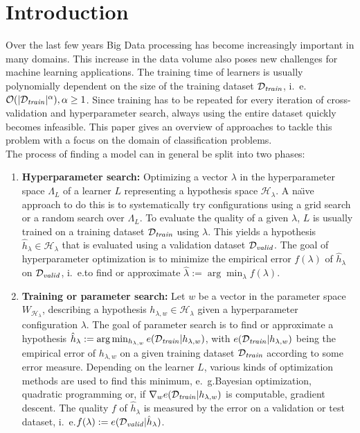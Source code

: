 \section{Introduction}%
\label{sec:intro}

\setcounter{page}{1}			%

Over the last few years Big Data processing has become increasingly important in many domains.
This increase in the data volume also poses new challenges for machine learning applications.
The training time of learners is usually polynomially dependent on the size of the training dataset \(\mathcal{D}_{\mathit{train}}\), i.~e. \(\mathcal{O}(|\mathcal{D}_{\mathit{train}}|^\alpha), \alpha \geq 1\).
Since training has to be repeated for every iteration of cross-validation and hyperparameter search, always using the entire dataset quickly becomes infeasible.
This paper gives an overview of approaches to tackle this problem with a focus on the domain of classification problems.\\

The process of finding a model can in general be split into two phases:
\begin{enumerate}
	\item \textbf{Hyperparameter search:}
		Optimizing a vector \(\lambda\) in the hyperparameter space \(\Lambda_L\) of a learner \(L\) representing a hypothesis space \(\mathcal{H}_{\lambda}\).
		A na{\"\i}ve approach to do this is to systematically try configurations using a grid search or a random search over \(\Lambda_L\).
		To evaluate the quality of a given \(\lambda\), \(L\) is usually trained on a training dataset \(\mathcal{D}_{\mathit{train}}\) using \(\lambda\). This yields a hypothesis \(\hat{h}_\lambda \in \mathcal{H}_{\lambda}\) that is evaluated using a validation dataset \(\mathcal{D}_{\mathit{valid}}\).
		The goal of hyperparameter optimization is to minimize the empirical error \(f(\lambda)\) of \(\hat{h}_\lambda\) on \(\mathcal{D}_{\mathit{valid}}\), i.~e.\@ to find or approximate \(\hat{\lambda} := \arg\min_{\lambda}{f(\lambda)}\).
	\item \textbf{Training or parameter search:}
		Let \(w\) be a vector in the parameter space \(W_{\mathcal{H}_\lambda}\), describing a hypothesis \(h_{\lambda, w} \in \mathcal{H}_\lambda\) given a hyperparameter configuration \(\lambda\).
		The goal of parameter search is to find or approximate a hypothesis \(\hat{h}_\lambda := \arg\min_{h_{\lambda, w}}{e(\mathcal{D}_{\mathit{train}} | h_{\lambda, w})}\), with \(e(\mathcal{D}_{\mathit{train}} | h_{\lambda, w})\) being the empirical error of \(h_{\lambda, w}\) on a given training dataset \(\mathcal{D}_{\mathit{train}}\) according to some error measure.
		Depending on the learner \(L\), various kinds of optimization methods are used to find this minimum, e.~g.\@ Bayesian optimization, quadratic programming or, if \(\nabla_w e(\mathcal{D}_{\mathit{train}} | h_{\lambda, w})\) is computable, gradient descent.
		The quality \(f\) of \(\hat{h}_\lambda\) is measured by the error on a validation or test dataset, i.~e.\@ \(f(\lambda) := e(\mathcal{D}_{\mathit{valid}} | \hat{h}_\lambda)\).
\end{enumerate}

